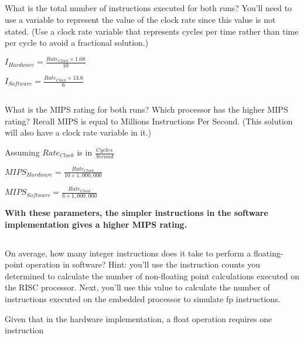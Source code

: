 \documentclass{article}
\begin{document}
\vspace{5mm}
\begin{adjustwidth}{2.5em}{0pt}
\subsection{}
What is the total number of instructions executed for both runs? You'll need to use a variable to represent the value of the clock rate since this value is not stated. (Use a clock rate variable that represents cycles per time rather than time per cycle to avoid a fractional solution.)

\vspace{5mm}
$I_{Hardware}=\frac{Rate_{Clock}\times{1.08}}{10}$

$I_{Software}=\frac{Rate_{Clock}\times{13.6}}{6}$

\vspace{5mm}
\subsection{}
What is the MIPS rating for both runs? Which processor has the higher MIPS rating? Recall MIPS is equal to Millions Instructions Per Second. (This solution will also have a clock rate variable in it.)

\vspace{5mm}

Assuming $Rate_{Clock}$ is in $\frac{Cycles}{Second}$

\vspace{3mm}
$MIPS_{Hardware}=\frac{Rate_{Clock}}{10\times{1,000,000}}$

\vspace{3mm}
$MIPS_{Software}=\frac{Rate_{Clock}}{6\times{1,000,000}}$

\vspace{3mm}
\textbf{With these parameters, the simpler instructions in the software implementation gives a higher MIPS rating.}
\subsection{}
On average, how many integer instructions does it take to perform a floating-point operation in software? Hint: you'll use the instruction counts you determined to calculate the number of non-floating point calculations executed on the RISC processor. Next, you'll use this value to calculate the number of instructions executed on the embedded processor to simulate fp instructions.

\vspace{5mm}
Given that in the hardware implementation, a float operation requires one instruction 


\end{adjustwidth}
\end{document}
